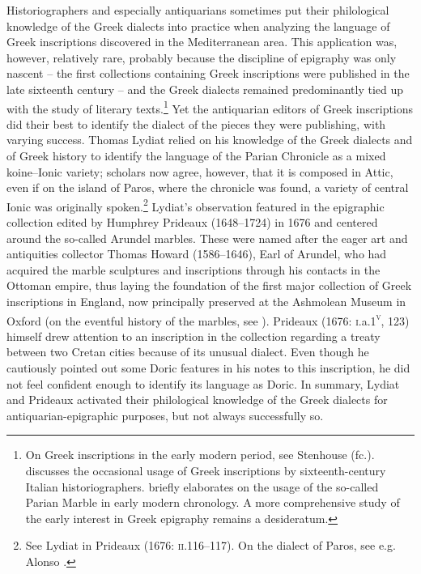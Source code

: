 \documentclass[output=paper]{langsci/langscibook}
\begin{document}
Historiographers and especially antiquarians sometimes put their philological knowledge of the Greek dialects into practice when analyzing the language of Greek inscriptions discovered in the Mediterranean area. This application was, however, relatively rare, probably because the discipline of epigraphy was only nascent – the first collections containing Greek inscriptions were published in the late sixteenth century – and the Greek dialects remained predominantly tied up with the study of literary texts.\footnote{On Greek inscriptions in the early modern period, see Stenhouse (fc.). \citet{Stenhouse2005} discusses the occasional usage of Greek inscriptions by sixteenth-century Italian historiographers. \citet{Liddel2014} briefly elaborates on the usage of the so-called Parian Marble in early modern chronology. A more comprehensive study of the early interest in Greek epigraphy remains a desideratum.} Yet the antiquarian editors of Greek inscriptions did their best to identify the dialect of the pieces they were publishing, with varying success. Thomas Lydiat relied on his knowledge of the Greek dialects and of Greek history to identify the language of the Parian Chronicle as a mixed koine–Ionic variety; scholars now agree, however, that it is composed in Attic, even if on the island of Paros, where the chronicle was found, a variety of central Ionic was originally spoken.\footnote{See Lydiat in Prideaux (1676: \textsc{ii}.116–117). On the dialect of Paros, see e.g. Alonso \citet[531]{Déniz2018}.} Lydiat’s observation featured in the epigraphic collection edited by Humphrey Prideaux (1648–1724) in 1676 and centered around the so-called Arundel marbles. These were named after the eager art and antiquities collector Thomas Howard (1586–1646), Earl of Arundel, who had acquired the marble sculptures and inscriptions through his contacts in the Ottoman empire, thus laying the foundation of the first major collection of Greek inscriptions in England, now principally preserved at the Ashmolean Museum in Oxford (on the eventful history of the marbles, see \citealt{Vickers2006}). Prideaux (1676: \textsc{i.}a.1\textsc{\textsuperscript{v}}, 123) himself drew attention to an inscription in the collection regarding a treaty between two Cretan cities because of its unusual dialect. Even though he cautiously pointed out some Doric features in his notes to this inscription, he did not feel confident enough to identify its language as Doric. In summary, Lydiat and Prideaux activated their philological knowledge of the Greek dialects for antiquarian-epigraphic purposes, but not always successfully so.
\end{document}
